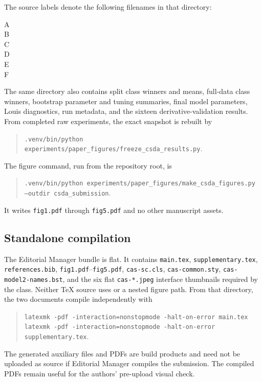 \documentclass[a4paper,fleqn]{cas-sc}
\numberwithin{equation}{section}
\begin{document}
The source labels denote the following filenames in that directory:
\begin{description}
\item[A] 
\item[B] 
\item[C] 
\item[D] 
\item[E] 
\item[F] 
\end{description}
The same directory also contains split class winners and means, full-data class winners, bootstrap parameter and tuning summaries, final model parameters, Louis diagnostics, run metadata, and the sixteen derivative-validation results. From completed raw experiments, the exact snapshot is rebuilt by
\begin{quote}
\small\texttt{.venv/bin/python experiments/paper\_figures/freeze\_csda\_results.py}.
\end{quote}

The figure command, run from the repository root, is
\begin{quote}
\small
\texttt{.venv/bin/python experiments/paper\_figures/make\_csda\_figures.py}\\
\texttt{\hspace*{2em}--outdir csda\_submission}.
\end{quote}
It writes \texttt{fig1.pdf} through \texttt{fig5.pdf} and no other manuscript assets.

\subsection{Standalone compilation}

The Editorial Manager bundle is flat. It contains
\texttt{main.tex}, \texttt{supplementary.tex}, \texttt{references.bib},
\texttt{fig1.pdf}--\texttt{fig5.pdf}, \texttt{cas-sc.cls},
\texttt{cas-common.sty}, \texttt{cas-model2-names.bst}, and the six flat \texttt{cas-*.jpeg} interface thumbnails required by the class. Neither TeX source uses \verb|| or a nested figure path. From that directory, the two documents compile independently with
\begin{quote}
\small
\texttt{latexmk -pdf -interaction=nonstopmode -halt-on-error main.tex}\\
\texttt{latexmk -pdf -interaction=nonstopmode -halt-on-error supplementary.tex}.
\end{quote}
The generated auxiliary files and PDFs are build products and need not be uploaded as source if Editorial Manager compiles the submission. The compiled PDFs remain useful for the authors' pre-upload visual check.
\end{document}
